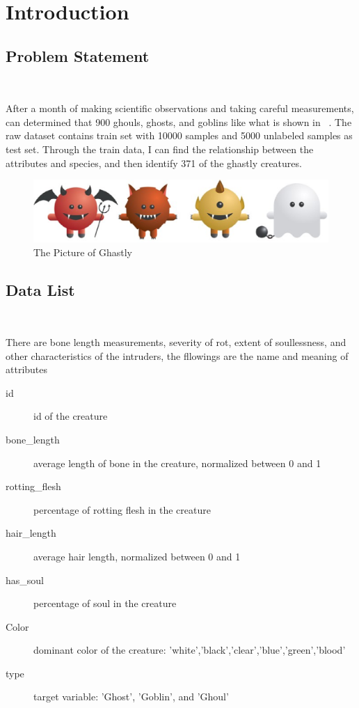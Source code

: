 
\section{Introduction}\label{sec-intro}

\subsection{Problem Statement}
\

After a month of making scientific observations 
and taking careful measurements, 
can determined that 900 ghouls, ghosts, and goblins
like what is shown in~  .
The raw dataset contains train set with 10000 %
samples and 5000 unlabeled samples as test set.
Through the train data, I can find the relationship
between the attributes and species, 
and then identify 371 of the ghastly creatures.


\begin{figure}[htbp]
	\centering
	\includegraphics[scale=0.3]{figures/bar.eps}
	\caption{The Picture of Ghastly}\label{fig:animal}
\end{figure}


\subsection{Data List}
\

There are bone length measurements, 
severity of rot, extent of soullessness, 
and other characteristics of the intruders,
the fllowings are the  
name and meaning of attributes


\begin{description}
	\item[id] id of the creature
	\item[bone_length] average length of bone in the creature, normalized between 0 and 1
	\item[rotting_flesh] percentage of rotting flesh in the creature
	\item[hair_length] average hair length, normalized between 0 and 1
	\item[has_soul] percentage of soul in the creature
	\item[Color] dominant color of the creature: 'white','black','clear','blue','green','blood'
	\item[type] target variable: 'Ghost', 'Goblin', and 'Ghoul'
\end{description}


